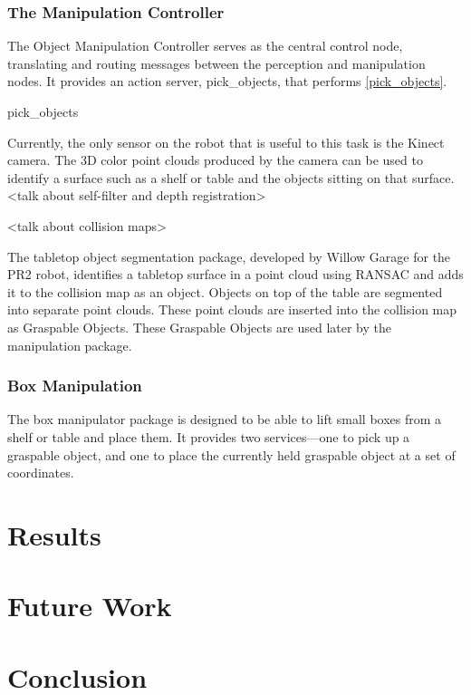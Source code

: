 \documentclass{article}
\begin{document}
\subsubsection{The Manipulation Controller}
The Object Manipulation Controller serves as the central control node, translating and routing messages between the perception and manipulation nodes. It provides an action server, pick\_objects, that performs \ref{pick_objects}.

\begin{algorithm}
\caption{pick_objects}
\label{pick_objects}
\begin{algorithmic}
\end{algorithmic}
\end{algorithm}

Currently, the only sensor on the robot that is useful to this task is the Kinect camera. The 3D color point clouds produced by the camera can be used to identify a surface such as a shelf or table and the objects sitting on that surface. {\textless}talk about self-filter and depth registration{\textgreater}

{\textless}talk about collision maps{\textgreater}

The tabletop object segmentation package, developed by Willow Garage \cite{tabletop} for the PR2 robot, identifies a tabletop surface in a point cloud using RANSAC \cite{ransac} and adds it to the collision map as an object. Objects on top of the table are segmented into separate point clouds. These point clouds are inserted into the collision map as Graspable Objects. These Graspable Objects are used later by the manipulation package.

\subsubsection[Box Manipulation]{Box Manipulation}
The box manipulator package is designed to be able to lift small boxes from a shelf or table and place them. It provides two services---one to pick up a graspable object, and one to place the currently held graspable object at a set of coordinates. 

\section[Results]{Results}
\section[Future Work]{Future Work}
\section[Conclusion]{Conclusion}
\end{document}
